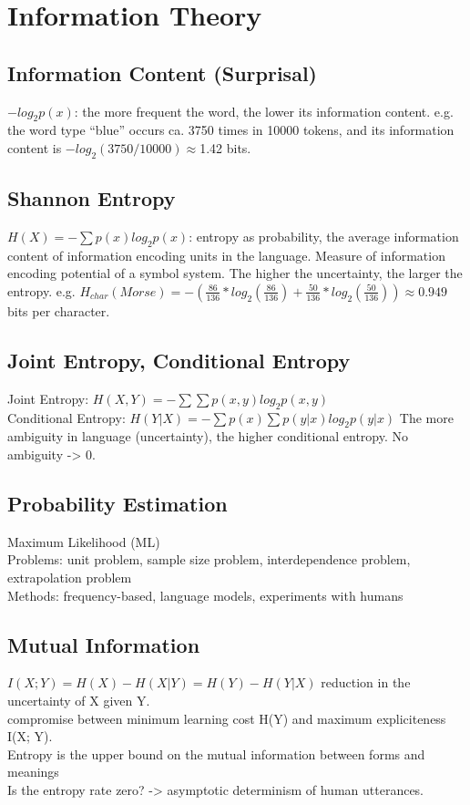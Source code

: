 \section{Information Theory}

\subsection*{Information Content (Surprisal)}
$-log_2 p(x)$: the more frequent the word, the lower its information content.
e.g. the word type “blue” occurs ca. 3750 times in
10000 tokens, and its information content is $-log_2(3750/10000) \approx$1.42 bits.

\subsection*{Shannon Entropy}
$H(X) = - \sum p(x) log_2 p(x)$: entropy as probability, the average information content of information encoding units in the language. Measure of information encoding potential of a symbol system. The higher the uncertainty, the larger the entropy. e.g. $H_{char}(Morse) = - (\frac{86}{136} * log_2(\frac{86}{136}) + \frac{50}{136} * log_2(\frac{50}{136})) \approx 0.949$ bits per character. \\

\subsection*{Joint Entropy, Conditional Entropy}
Joint Entropy: $H(X, Y) = - \sum \sum p(x, y) log_2 p(x, y)$ \\
Conditional Entropy: $H(Y|X) = - \sum p(x) \sum p(y|x) log_2 p(y|x)$ The more ambiguity in language (uncertainty), the higher conditional entropy. No ambiguity -> 0.

\subsection*{Probability Estimation}
Maximum Likelihood (ML) \\
Problems: unit problem, sample size problem, interdependence problem, extrapolation problem \\
Methods: frequency-based, language models, experiments with humans

\subsection*{Mutual Information}
$I(X; Y) = H(X) - H(X|Y) = H(Y) - H(Y|X)$ reduction in the uncertainty of X given Y. \\
compromise between minimum learning cost H(Y) and maximum expliciteness I(X; Y). \\
Entropy is the upper bound on the mutual information between forms and meanings \\
Is the entropy rate zero? -> asymptotic determinism of human utterances.







